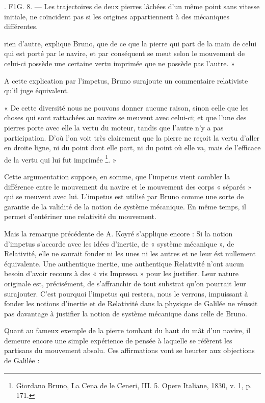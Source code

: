  

.  F1G. 8. — Les trajectoires de deux pierres lâchées d’un même point sans
vitesse initiale, ne coïncident pas si les origines appartiennent à des mécaniques
différentes.

rien d’autre, explique Bruno, que de ce que la pierre qui part de la main
de celui qui est porté par le navire, et par conséquent se meut selon le
mouvement de celui-ci possède une certaine vertu imprimée que ne possède
pas l’autre. »

A cette explication par l’impetus, Bruno surajoute un commentaire
relativiste qu’il juge équivalent.

« De cette diversité nous ne pouvons donner aucune raison, sinon
celle que les choses qui sont rattachées au navire se meuvent avec celui-ci;
et que l’une des pierres porte avec elle la vertu du moteur, tandis que
l’autre n’y a pas participation. D’où l’on voit très clairement que la
pierre ne reçoit la vertu d’aller en droite ligne, ni du point dont elle part,
ni du point où elle va, mais de l’efficace de la vertu qui lui fut imprimée \footnote{Giordano Bruno, La Cena de le Ceneri, III. 5. Opere Italiane, 1830, v. 1,
p. 171.}. »

Cette argumentation suppose, en somme, que l’impetus vient combler
la différence entre le mouvement du navire et le mouvement des corps
« séparés » qui se meuvent avec lui. L’impetus est utilisé par Bruno
comme une sorte de garantie de la validité de la notion de système
mécanique. En même temps, il permet d’entériner une relativité du
mouvement.

Mais la remarque précédente de A. Koyré s’applique encore : Si la
notion d’impetus s’accorde avec les idées d’inertie, de « système mécanique »,
de Relativité, elle ne saurait fonder ni les unes ni les autres et
ne leur ést nullement équivalente. Une authentique inertie, une authentique
Relativité n’ont aucun besoin d’avoir recours à des « vis Impressa »
pour les justifier. Leur nature originale est, précisément, de s’affranchir de
tout substrat qu’on pourrait leur surajouter. C’est pourquoi l’impetus
qui restera, nous le verrons, impuissant à fonder les notions d’inertie et
de Relativité dans la physique de Galilée ne réussit pas davantage à
justifier la notion de système mécanique dans celle de Bruno.

Quant au fameux exemple de la pierre tombant du haut du mât d’un
navire, il demeure encore une simple expérience de pensée à laquelle se
réfèrent les partisans du mouvement absolu. Ces affirmations vont se
heurter aux objections de Galilée :

